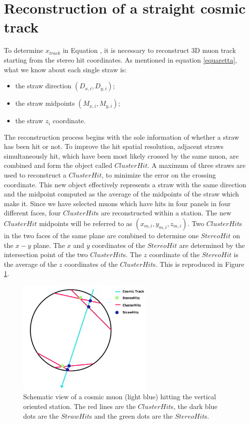 \section{Reconstruction of a straight cosmic track}\label{reconstruction}
To determine $x_{track}$ in Equation \label{ffffff}, 
it is necessary to reconstruct 3D muon track 
starting from the stereo hit coordinates.
As mentioned in equation \ref{equaretta}, 
what we know about each single straw is:
\begin{itemize}
    \item the straw direction $(D_{x,i},D_{y,i})$;
    \item the straw midpoints $(M_{x,i},M_{y,i})$;
    \item the straw $z_i$ coordinate.
\end{itemize} 
The reconstruction process begins 
with the sole information of whether 
a straw has been hit or not.
To improve the hit spatial resolution, adjacent 
straws simultaneously hit, which have been most 
likely crossed by the same muon, are combined 
and form the object called $ClusterHit$. 
A maximum of three straws are used to reconstruct a 
$ClusterHit$, to minimize the error on 
the crossing coordinate.
This new object effectively represents a 
straw with the same direction and the midpoint 
computed as the average of the midpoints of the straw 
which make it. Since we have selected muons which 
have hits in four panels in four different 
faces, four $ClusterHit$s are reconstructed 
within a station. The new $ClusterHit$ 
midpoints will be referred to as 
$(x_{m,i}, y_{m,i}, z_{m,i})$.
Two $ClusterHit$s in the two faces of the same 
plane are combined to determine one $StereoHit$ on 
the $x-y$ plane. 
The $x$ and $y$ coordinates of the 
$StereoHit$ are determined by the 
intersection point of the two 
$ClusterHit$s. The $z$ coordinate of 
the $StereoHit$ is the average of the 
$z$ coordinates of the $ClusterHit$s.
This is reproduced in Figure \ref{fig:stco}.
\begin{figure}[!h]
    \centering
    \includegraphics[width =0.6\textwidth]{figures/png/Screenshot_20240810_210144.png}
    \caption[Schematic view of a cosmic muon hitting the vertical oriented station.]{Schematic view of a cosmic muon (light blue) hitting the vertical oriented station. The red lines are the $ClusterHit$s, the dark blue dots 
    are the $StrawHit$s and the green dots are the $StereoHit$s.}
    \label{fig:stco}
\end{figure}
